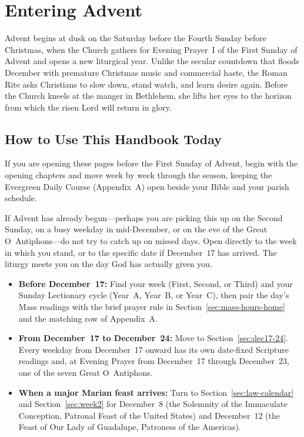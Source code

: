 \section{Entering Advent}\label{sec:entering}

Advent begins at dusk on the Saturday before the Fourth Sunday before Christmas, when the Church gathers for Evening Prayer~I of the First Sunday of Advent and opens a new liturgical year. Unlike the secular countdown that floods December with premature Christmas music and commercial haste, the Roman Rite asks Christians to slow down, stand watch, and learn desire again. Before the Church kneels at the manger in Bethlehem, she lifts her eyes to the horizon from which the risen Lord will return in glory.

\subsection{How to Use This Handbook Today}

If you are opening these pages before the First Sunday of Advent, begin with the opening chapters and move week by week through the season, keeping the Evergreen Daily Course (Appendix~A) open beside your Bible and your parish schedule.

If Advent has already begun---perhaps you are picking this up on the Second Sunday, on a busy weekday in mid-December, or on the eve of the Great O~Antiphons---do not try to catch up on missed days. Open directly to the week in which you stand, or to the specific date if December~17 has arrived. The liturgy meets you on the day God has actually given you.

\begin{itemize}
  \item \textbf{Before December~17:} Find your week (First, Second, or Third) and your Sunday Lectionary cycle (Year~A, Year~B, or Year~C), then pair the day's Mass readings with the brief prayer rule in Section~\ref{sec:mass-hours-home} and the matching row of Appendix~A.
  \item \textbf{From December~17 to December~24:} Move to Section~\ref{sec:dec17-24}. Every weekday from December~17 onward has its own date-fixed Scripture readings and, at Evening Prayer from December~17 through December~23, one of the seven Great O~Antiphons.
  \item \textbf{When a major Marian feast arrives:} Turn to Section~\ref{sec:law-calendar} and Section~\ref{sec:week2} for December~8 (the Solemnity of the Immaculate Conception, Patronal Feast of the United States) and December~12 (the Feast of Our Lady of Guadalupe, Patroness of the Americas).
\end{itemize}

